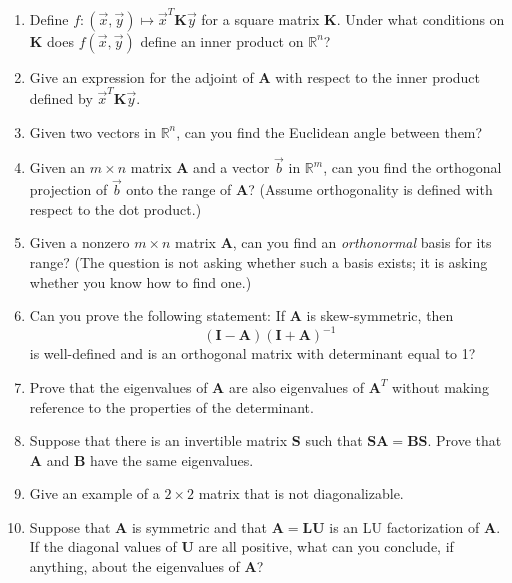 \documentclass[11pt,fleqn]{article}
\newcommand{\mat}[1]{\mathbf{#1}}
\begin{document}
\begin{enumerate}
\item Define $f:(\vec{x},\vec{y})\mapsto \vec{x}^T\mat{K}\vec{y}$ for a square matrix $\mat{K}$. Under what conditions on $\mat{K}$ does $f(\vec{x},\vec{y})$ define an inner product on $\mathbb{R}^n$?
\item Give an expression for the adjoint of $\mat{A}$ with respect to the inner product defined by $\vec{x}^T\mat{K}\vec{y}$.
\item Given two vectors in $\mathbb{R}^n$, can you find the Euclidean angle between them?
\item Given an $m\times n$ matrix $\mat{A}$ and a vector $\vec{b}$ in $\mathbb{R}^m$, can you find the orthogonal projection of $\vec{b}$ onto the range of $\mat{A}$? (Assume orthogonality is defined with respect to the dot product.)
\item Given a nonzero $m\times n$ matrix $\mat{A}$, can you find an {\it orthonormal} basis for its range? (The question is not asking whether such a basis exists; it is asking whether you know how to find one.)
\item Can you prove the following statement: If $\mathbf{A}$ is skew-symmetric, then 
\[\left(\mat{I} - \mat{A}\right)\left(\mat{I} + \mat{A}\right)^{-1}\]
is well-defined and is an orthogonal matrix with determinant equal to 1?
\item Prove that the eigenvalues of $\mat{A}$ are also eigenvalues of $\mat{A}^T$ without making reference to the properties of the determinant.
\item Suppose that there is an invertible matrix $\mat{S}$ such that $\mat{SA} = \mat{BS}$. Prove that $\mat{A}$ and $\mat{B}$ have the same eigenvalues. 
\item Give an example of a $2\times 2$ matrix that is not diagonalizable.
\item Suppose that $\mat{A}$ is symmetric and that $\mat{A}=\mat{LU}$ is an LU factorization of $\mat{A}$. If the diagonal values of $\mat{U}$ are all positive, what can you conclude, if anything, about the eigenvalues of $\mat{A}$?

\end{enumerate}
\end{document}
